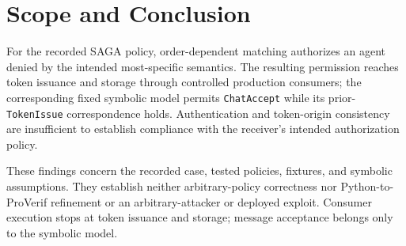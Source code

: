 \section{Scope and Conclusion}
\label{sec:discussion}
\label{sec:conclusion}

For the recorded SAGA policy, order-dependent matching authorizes an agent
denied by the intended most-specific semantics. The resulting permission
reaches token issuance and storage through controlled production consumers;
the corresponding fixed symbolic model permits \texttt{ChatAccept} while its
prior-\texttt{TokenIssue} correspondence holds. Authentication and token-origin
consistency are insufficient to establish compliance with the receiver's
intended authorization policy.

These findings concern the recorded case, tested policies, fixtures, and
symbolic assumptions. They establish neither arbitrary-policy correctness nor
Python-to-ProVerif refinement or an arbitrary-attacker or deployed exploit.
Consumer execution stops at token issuance and storage; message acceptance
belongs only to the symbolic model.
